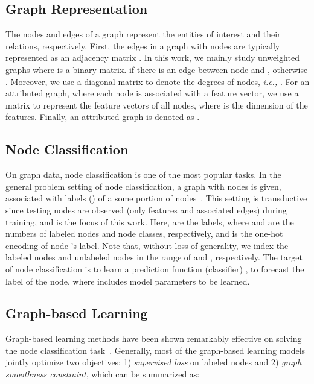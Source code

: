 \documentclass[10pt,journal,compsoc]{IEEEtran}
\newcommand{\ie}{\emph{i.e., }}
\begin{document}
\subsection{Graph Representation}
The nodes and edges of a graph represent the entities of interest and their relations, respectively. First, the edges in a graph with  nodes are typically represented as an adjacency matrix . In this work, we mainly study unweighted graphs where  is a binary matrix.  if there is an edge between node  and , otherwise . Moreover, we use a diagonal matrix  to denote the degrees of nodes, \ie . For an attributed graph, where each node is associated with a feature vector, we use a matrix  to represent the feature vectors of all nodes, where  is the dimension of the features. Finally, an attributed graph is denoted as .

\subsection{Node Classification}
On graph data, node classification is one of the most popular tasks. In the general problem setting of node classification, a graph  with  nodes is given, associated with labels () of a some portion of nodes~\cite{kipf2017semi,yang2016revisiting,velickovic2018graph}. This setting is transductive since testing nodes are observed (only features and associated edges) during training, and is the focus of this work. Here,  are the labels, where  and  are the numbers of labeled nodes and node classes, respectively, and  is the one-hot encoding of node 's label. Note that, without loss of generality, we index the labeled nodes and unlabeled nodes in the range of  and , respectively. The target of node classification is to learn a prediction function (classifier) , to forecast the label of the node, where  includes model parameters to be learned.

\subsection{Graph-based Learning}
Graph-based learning methods have been shown remarkably effective on solving the node classification task~\cite{zhu2003semi,zhou2004learning,belkin2006manifold,talukdar2009new}. Generally, most of the graph-based learning models jointly optimize two objectives: 1) \textit{supervised loss} on labeled nodes and 2) \textit{graph smoothness constraint}, which can be summarized as:
\end{document}
